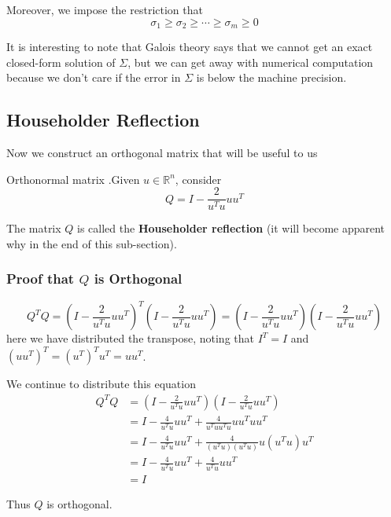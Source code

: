 \documentclass[12pt,letterpaper]{article}
\newcommand{\skipline}{\vspace{\baselineskip}}
\newcommand{\R}{\mathbb{R}}
\begin{document}
Moreover, we impose the restriction that
\begin{equation} \label{eq:sigma_inequality}
	\sigma_1 \geq \sigma_2 \geq \cdots \geq \sigma_m \geq 0
\end{equation}

\skipline

It is interesting to note that Galois theory says that we cannot get an exact closed-form solution of $\Sigma$, but we can get away with numerical computation because we don't care if the error in $\Sigma$ is below the machine precision.

\subsection{Householder Reflection}
Now we construct an orthogonal matrix that will be useful to us
\begin{constr}{Orthonormal matrix}
.Given $u \in \R^n$, consider
\begin{equation}
	Q = I-\frac{2}{u^T u} u u^T
\end{equation}
\end{constr}

The matrix $Q$ is called the \textbf{Householder reflection} (it will become apparent why in the end of this sub-section).

\subsubsection{Proof that $Q$ is Orthogonal}
\begin{equation}
Q^T Q = (I - \frac{2}{u^T u} u u^T)^T (I - \frac{2}{u^T u} u u^T) = (I - \frac{2}{u^T u} u u^T) (I - \frac{2}{u^T u} u u^T)
\end{equation}
here we have distributed the transpose, noting that $I^T = I$ and $(u u^T)^T = (u^T)^T u^T = u u^T$.

We continue to distribute this equation
\begin{align}
	Q^T Q &= (I - \frac{2}{u^T u} u u^T) (I - \frac{2}{u^T u} u u^T) \\
	&= I - \frac{4}{u^T u} u u^T + \frac{4}{u^T u u^T u} u u^T u u^T \\
	&= I - \frac{4}{u^T u} u u^T + \frac{4}{(u^T u) (u^T u)} u (u^T u) u^T \\
	&= I - \frac{4}{u^T u} u u^T + \frac{4}{u^T u} u u^T \\
	&= I
\end{align}

Thus $Q$ is orthogonal.
\end{document}
